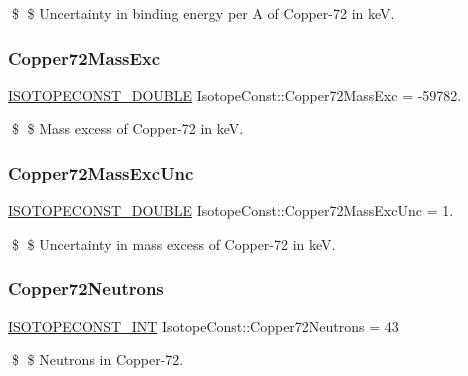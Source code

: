 \$ \$ Uncertainty in binding energy per A of Copper-\/72 in keV. \mbox{\label{group___isotope_const-_copper-_cu72_ga1d7240590b2742e30d0fa8208637a7be}} 
\subsubsection{\texorpdfstring{Copper72\+Mass\+Exc}{Copper72MassExc}}
{\footnotesize\ttfamily \mbox{\hyperlink{group___isotope_const-_macros_ga8f45a7272ce02c0b4c65c44636ed719a}{I\+S\+O\+T\+O\+P\+E\+C\+O\+N\+S\+T\+\_\+\+D\+O\+U\+B\+LE}} Isotope\+Const\+::\+Copper72\+Mass\+Exc = -\/59782.}

\$ \$ Mass excess of Copper-\/72 in keV. \mbox{\label{group___isotope_const-_copper-_cu72_gac3a305d2342e08eef132b5679e3ff0e5}} 
\subsubsection{\texorpdfstring{Copper72\+Mass\+Exc\+Unc}{Copper72MassExcUnc}}
{\footnotesize\ttfamily \mbox{\hyperlink{group___isotope_const-_macros_ga8f45a7272ce02c0b4c65c44636ed719a}{I\+S\+O\+T\+O\+P\+E\+C\+O\+N\+S\+T\+\_\+\+D\+O\+U\+B\+LE}} Isotope\+Const\+::\+Copper72\+Mass\+Exc\+Unc = 1.}

\$ \$ Uncertainty in mass excess of Copper-\/72 in keV. \mbox{\label{group___isotope_const-_copper-_cu72_ga20682f81cb9f926d06dced792a99e595}} 
\subsubsection{\texorpdfstring{Copper72\+Neutrons}{Copper72Neutrons}}
{\footnotesize\ttfamily \mbox{\hyperlink{group___isotope_const-_macros_ga5f18360b3e99483a35c32d789e62621c}{I\+S\+O\+T\+O\+P\+E\+C\+O\+N\+S\+T\+\_\+\+I\+NT}} Isotope\+Const\+::\+Copper72\+Neutrons = 43}

\$ \$ Neutrons in Copper-\/72. \mbox{\label{group___isotope_const-_copper-_cu72_ga0ef0a13d765d040a36672568ff54bbf2}} 
